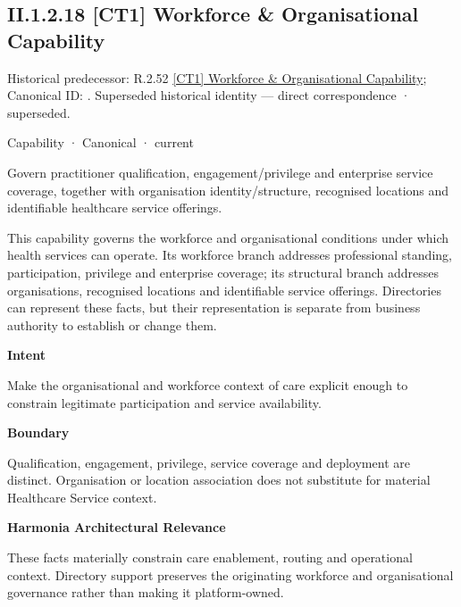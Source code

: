 \subsection*{II.1.2.18 [CT1] Workforce \& Organisational Capability}
\label{navigation:II.1.2.18}

{\small Historical predecessor: R.2.52 \hyperref[element:b1161fe1a315420fbc7d048a1ea58126]{[CT1] Workforce \& Organisational Capability}; Canonical ID: \texttt{}. Superseded historical identity — direct correspondence · superseded.}\par
\label{element:631b43664bfb4c50ac8cf4958b2c347d}
{\small Capability · Canonical · current}\par

Govern practitioner qualification, engagement/privilege and enterprise service coverage, together with organisation identity/structure, recognised locations and identifiable healthcare service offerings.



This capability governs the workforce and organisational conditions under which health services can operate. Its workforce branch addresses professional standing, participation, privilege and enterprise coverage; its structural branch addresses organisations, recognised locations and identifiable service offerings. Directories can represent these facts, but their representation is separate from business authority to establish or change them.



\textbf{Intent}



Make the organisational and workforce context of care explicit enough to constrain legitimate participation and service availability.



\textbf{Boundary}



Qualification, engagement, privilege, service coverage and deployment are distinct. Organisation or location association does not substitute for material Healthcare Service context.



\textbf{Harmonia Architectural Relevance}



These facts materially constrain care enablement, routing and operational context. Directory support preserves the originating workforce and organisational governance rather than making it platform-owned.


